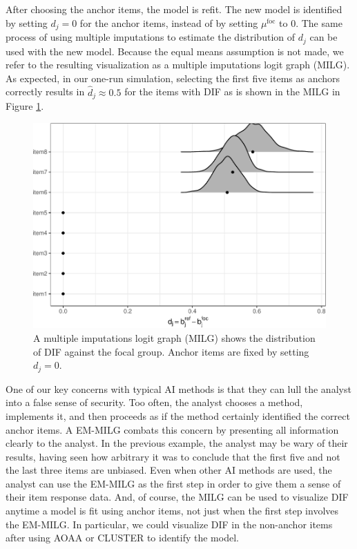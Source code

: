 \documentclass[
  11pt,
]{article}
\begin{document}
After choosing the anchor items, the model is refit. The new model is identified by setting \(d_j = 0\) for the anchor items, instead of by setting \(\mu^\text{foc}\) to \(0\). The same process of using multiple imputations to estimate the distribution of \(d_j\) can be used with the new model. Because the equal means assumption is not made, we refer to the resulting visualization as a multiple imputations logit graph (MILG). As expected, in our one-run simulation, selecting the first five items as anchors correctly results in \(\hat d_j \approx 0.5\) for the items with DIF as is shown in the MILG in Figure \ref{fig:milg}.

\begin{figure}[H]

{\centering \includegraphics[width=0.7\linewidth]{paper_files/figure-latex/milg-1} 

}

\caption{A multiple imputations logit graph (MILG) shows the distribution of DIF against the focal group. Anchor items are fixed by setting $d_j = 0$.}\label{fig:milg}
\end{figure}

One of our key concerns with typical AI methods is that they can lull the analyst into a false sense of security. Too often, the analyst chooses a method, implements it, and then proceeds as if the method certainly identified the correct anchor items. A EM-MILG combats this concern by presenting all information clearly to the analyst. In the previous example, the analyst may be wary of their results, having seen how arbitrary it was to conclude that the first five and not the last three items are unbiased. Even when other AI methods are used, the analyst can use the EM-MILG as the first step in order to give them a sense of their item response data. And, of course, the MILG can be used to visualize DIF anytime a model is fit using anchor items, not just when the first step involves the EM-MILG. In particular, we could visualize DIF in the non-anchor items after using AOAA or CLUSTER to identify the model.
\end{document}
